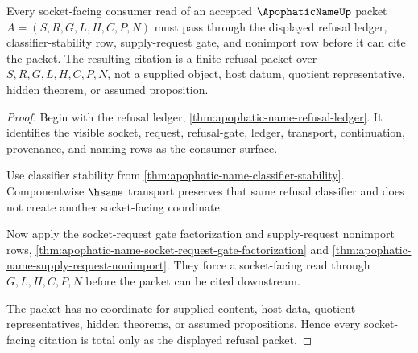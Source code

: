 \begin{theorem}
\label{thm:apophatic-name-socket-refusal-totality}
Every socket-facing consumer read of an accepted $\ApophaticNameUp$ packet $A=(S,R,G,L,H,C,P,N)$ must pass through the displayed refusal ledger, classifier-stability row, supply-request gate, and nonimport row before it can cite the packet. The resulting citation is a finite refusal packet over $S,R,G,L,H,C,P,N$, not a supplied object, host datum, quotient representative, hidden theorem, or assumed proposition.
\end{theorem}
\begin{proof}
Begin with the refusal ledger, \autoref{thm:apophatic-name-refusal-ledger}. It identifies the visible socket, request, refusal-gate, ledger, transport, continuation, provenance, and naming rows as the consumer surface.

Use classifier stability from \autoref{thm:apophatic-name-classifier-stability}. Componentwise $\hsame$ transport preserves that same refusal classifier and does not create another socket-facing coordinate.

Now apply the socket-request gate factorization and supply-request nonimport rows, \autoref{thm:apophatic-name-socket-request-gate-factorization} and \autoref{thm:apophatic-name-supply-request-nonimport}. They force a socket-facing read through $G,L,H,C,P,N$ before the packet can be cited downstream.

The packet has no coordinate for supplied content, host data, quotient representatives, hidden theorems, or assumed propositions. Hence every socket-facing citation is total only as the displayed refusal packet.
\end{proof}

